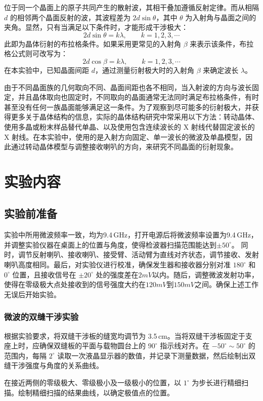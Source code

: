 \documentclass[UTF-8,twoside,cs4size]{ctexart}
\begin{document}
位于同一个晶面上的原子共同产生的散射波，其相干叠加遵循反射定律。而从相隔 $d$ 的相邻两个晶面反射的波，其波程差为 $2d \sin \theta$，其中 $\theta$ 为入射角与晶面之间的夹角。显然，只有当满足以下条件时，才能形成干涉极大：
\[
2d \sin \theta = k \lambda, \qquad k = 1, 2, 3, \cdots
\]
此即为晶体衍射的布拉格条件。如果采用更常见的入射角 $\beta$ 来表示该条件，布拉格公式则可改写为：
\[
2d \cos \beta = k \lambda, \qquad k = 1, 2, 3, \cdots
\]
在本实验中，已知晶面间距 $d$，通过测量衍射极大时的入射角 $\beta$ 来确定波长 $\lambda$。

由于不同晶面族的几何取向不同、晶面间距也各不相同，当入射波的方向与波长固定，并且晶体取向也固定时，不同取向的晶面通常无法同时满足布拉格条件，有时甚至没有任何一族晶面能够满足这一条件。为了观察到尽可能多的衍射极大，并获得更多关于晶体结构的信息，实际的晶体结构研究中常采用以下方法：转动晶体、使用多晶或粉末样品替代单晶、以及使用包含连续波长的 X 射线代替固定波长的 X 射线。在本实验中，使用的是入射方向固定、单一波长的微波及单晶模型，因此通过转动晶体模型与调整接收喇叭的方向，来研究不同晶面的衍射现象。

\section{实验内容}
\subsection{实验前准备}
实验中所用微波频率一致，均为9.4\,GHz，打开电源后将微波频率设置为9.4\,GHz，并调整实验仪器在桌面上的位置与角度，使得检波器扫描范围能达到$ \pm50^\circ $。
同时，调节反射喇叭、接收喇叭、接受臂、活动臂为直线对齐状态，调节接收、发射喇叭高度相同。最后，对实验仪进行校准，确保发生器和接收器分别对准 $180^\circ$ 和 $0^\circ$ 位置，且接收信号在 $\pm 20^\circ$ 处的强度差在$2mV$以内。随后，调整微波发射功率，使得在零级极大点处接收到的信号强度大约在$120mV$到$150mV$之间。确保上述工作无误后开始实验。
\subsubsection{微波的双缝干涉实验}

根据实验要求，将双缝干涉板的缝宽均调节为 3.5\,cm。当将双缝干涉板固定于支座上时，应确保双缝板的平面与载物圆台上的 $90^\circ$ 指示线对齐。在 $-50^\circ \sim 50^\circ$ 的范围内，每隔 $2^\circ$ 读取一次液晶显示器的数值，并记录下测量数据，然后绘制出双缝干涉强度与角度的关系曲线。

在接近两侧的零级极大、零级极小及一级极小的位置，以 $1^\circ$ 为步长进行精细扫描。绘制精细扫描的结果曲线，以确定极值点的位置。
\end{document}
